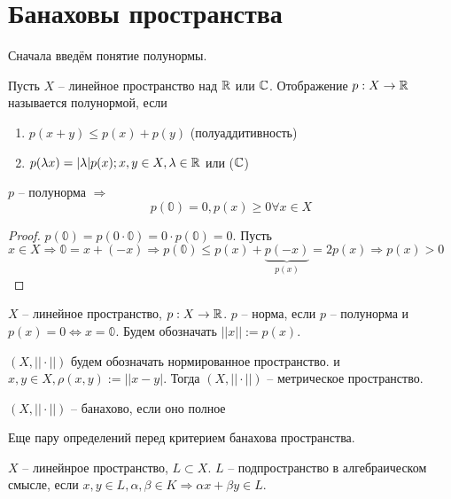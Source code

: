 \documentclass[document]{subfiles}
\begin{document}
\section{Банаховы пространства}

Сначала введём понятие полунормы.
\begin{definition}[полунорма]
    Пусть $X$ -- линейное пространство над $\mathbb{R}$ или $\mathbb{C}$. Отображение $p: X \rightarrow \mathbb{R}$ называется полунормой, если
    \begin{enumerate}
        \item $p(x + y) \leq p(x) + p(y)$ (полуаддитивность)
        \item $p(\lambda x) = |\lambda| p(x); x,y \in X, \lambda \in \mathbb{R}$ или ($\mathbb{C}$)
    \end{enumerate} 
\end{definition}

\begin{property}
    $p$ -- полунорма $\Rightarrow$
    \[ p(\mathbb{0}) = 0, p(x) \geq 0 \forall x \in X\]
\end{property}

\begin{proof}
    $p(\mathbb{0}) = p(0 \cdot \mathbb{0}) = 0 \cdot p(\mathbb{0}) = 0$.
    Пусть $x \in X \Rightarrow \mathbb{0} = x + (-x) \Rightarrow p(\mathbb{0}) \leq p(x) + \underbrace{p(-x)}_{p(x)} = 2p(x) \Rightarrow p(x) > 0$
\end{proof}

\begin{definition}[Норма]
    $X$ -- линейное пространство, $p : X \rightarrow \mathbb{R}$. $p$ -- норма, если $p$ -- полунорма и $p(x) = 0 \Leftrightarrow x = \mathbb{0}$.
    Будем обозначать $||x|| := p(x)$.
\end{definition}
$(X, || \cdot ||)$ будем обозначать нормированное пространство. и $x,y \in X, \rho(x,y) := ||x-y|$. Тогда $(X,||\cdot ||)$ -- метрическое пространство.

\begin{definition}
    $(X, || \cdot ||)$ -- банахово, если оно полное
\end{definition}
Еще пару определений перед критерием банахова пространства.

\begin{definition}
    $X$ -- линейнрое пространство, $L \subset X$. $L$ -- подпространство в алгебраическом смысле, если $x,y \in L, \alpha,\beta \in K \Rightarrow \alpha x + \beta y \in L$.
\end{definition}
\end{document}
